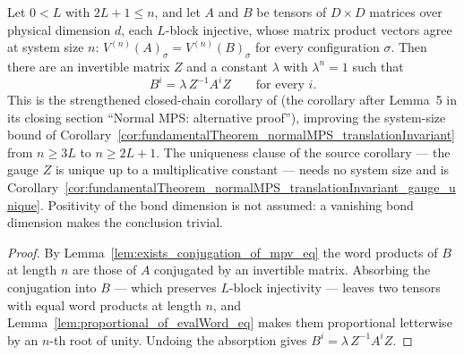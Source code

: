\begin{corollary}%
    \label{cor:fundamentalTheorem_normalMPS_translationInvariant_of_overlap}
    \leanok
    Let $0 < L$ with $2L + 1 \le n$, and let $A$ and $B$ be tensors of
    $D \times D$ matrices over physical dimension $d$, each $L$-block
    injective, whose matrix product vectors agree at system size $n$:
    $V^{(n)}(A)_\sigma = V^{(n)}(B)_\sigma$ for every configuration
    $\sigma$.  Then there are an invertible matrix $Z$ and a constant
    $\lambda$ with $\lambda^n = 1$ such that
    \[
        B^i = \lambda\, Z^{-1} A^i Z \qquad\text{for every } i .
    \]
    This is the strengthened closed-chain corollary of
    \cite{Molnar2018NormalPEPS} (the corollary after Lemma~5 in its closing
    section ``Normal MPS: alternative proof''), improving the system-size
    bound of
    Corollary~\ref{cor:fundamentalTheorem_normalMPS_translationInvariant}
    from $n \ge 3L$ to $n \ge 2L + 1$.  The uniqueness clause of the source
    corollary — the gauge $Z$ is unique up to a multiplicative constant —
    needs no system size and is
    Corollary~\ref{cor:fundamentalTheorem_normalMPS_translationInvariant_gauge_unique}.
    Positivity of the bond dimension is not assumed: a vanishing bond
    dimension makes the conclusion trivial.
\end{corollary}
\begin{proof}\leanok
    By Lemma~\ref{lem:exists_conjugation_of_mpv_eq} the word products of
    $B$ at length $n$ are those of $A$ conjugated by an invertible matrix.
    Absorbing the conjugation into $B$ — which preserves $L$-block
    injectivity — leaves two tensors with equal word products at length
    $n$, and Lemma~\ref{lem:proportional_of_evalWord_eq} makes them
    proportional letterwise by an $n$-th root of unity.  Undoing the
    absorption gives $B^i = \lambda\, Z^{-1} A^i Z$.
\end{proof}

